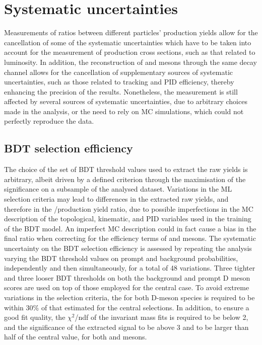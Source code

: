 \section{Systematic uncertainties}
Measurements of ratios between different particles' production yields allow for the cancellation of some of the systematic uncertainties which have to be taken into account for the measurement of production cross sections, such as that related to luminosity. In addition, the reconstruction of \ds and \dpl mesons through the same decay channel allows for the cancellation of supplementary sources of systematic uncertainties, such as those related to tracking and PID efficiency, thereby enhancing the precision of the results. Nonetheless, the measurement is still affected by several sources of systematic uncertainties, due to arbitrary choices made in the analysis, or the need to rely on MC simulations, which could not perfectly reproduce the data. 

\subsection{BDT selection efficiency}\label{sec:BDT}
The choice of the set of BDT threshold values used to extract the raw yields is arbitrary, albeit driven by a defined criterion through the maximisation of the significance on a subsample of the analysed dataset. Variations in the ML selection criteria may lead to differences in the extracted raw yields, and therefore in the \ds/\dpl production yield ratio, due to possible imperfections in the MC description of the topological, kinematic, and PID variables used in the training of the BDT model. An imperfect MC description could in fact cause a bias in the final ratio when correcting for the efficiency terms of \ds and \dpl mesons. The systematic uncertainty on the BDT selection efficiency is assessed by repeating the analysis varying the BDT threshold values on prompt and background probabilities, independently and then simultaneously, for a total of 48 variations. Three tighter and three looser BDT thresholds on both the background and prompt D meson scores are used on top of those employed for the central case. To avoid extreme variations in the selection criteria, the \aeffp for both D-meson species is required to be within 30\% of that estimated for the central selections. In addition, to ensure a good fit quality, the $\chi^2$/ndf of the invariant mass fits is required to be below 2, and the significance of the extracted signal to be above 3 and to be larger than half of the central value, for both \ds and \dpl mesons. 

